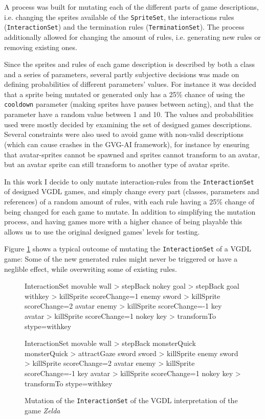 \documentclass[a4paper,titlepage,final]{report}
\begin{document}
A process was built for mutating each of the different parts of game descriptions, i.e. changing the sprites available of the \texttt{SpriteSet}, the interactions rules (\texttt{InteractionSet}) and the termination rules (\texttt{TerminationSet}).
The process additionally allowed for changing the amount of rules, i.e. generating new rules or removing existing ones.

Since the sprites and rules of each game description is described by both a class and a series of parameters, several partly subjective decisions was made on defining probabilities of different parameters' values.
For instance it was decided that a sprite being mutated or generated only has a 25\% chance of using the \texttt{cooldown} parameter (making sprites have pauses between acting), and that the parameter have a random value between 1 and 10.
The values and probabilities used were mostly decided by examining the set of designed games descriptions.
Several constraints were also used to avoid game with non-valid descriptions (which can cause crashes in the GVG-AI framework), for instance by ensuring that avatar-sprites cannot be spawned and sprites cannot transform to an avatar, but an avatar sprite can still transform to another type of avatar sprite.

In this work I decide to only mutate interaction-rules from the \texttt{InteractionSet} of designed VGDL games, and simply change every part (classes, parameters and references) of a random amount of rules, with each rule having a 25\% change of being changed for each game to mutate.
In addition to simplifying the mutation process, and having games more with a higher chance of being playable this allows us to use the original designed games' levels for testing.

Figure \ref{fig:mutatedzelda} shows a typical outcome of mutating the \texttt{InteractionSet} of a VGDL game: Some of the new generated rules might never be triggered or have a neglible effect, while overwriting some of existing rules.


\begin{figure}[!ht]
\centering
\begin{vgdldesc}[linewidth=14cm]
InteractionSet
	movable wall  > stepBack
	nokey goal    > stepBack
	goal withkey  > killSprite scoreChange=1
	enemy sword > killSprite scoreChange=2
	avatar enemy > killSprite scoreChange=-1
	key  avatar   > killSprite scoreChange=1
	nokey key     > transformTo stype=withkey  

InteractionSet
	movable wall > stepBack
	monsterQuick monsterQuick > attractGaze
	sword sword > killSprite
	enemy sword > killSprite scoreChange=2
	avatar enemy > killSprite scoreChange=-1
	key avatar > killSprite scoreChange=1
	nokey key > transformTo stype=withkey
\end{vgdldesc}
\caption{Mutation of the \texttt{InteractionSet} of the VGDL interpretation of the game \textit{Zelda}}
\label{fig:mutatedzelda}
\end{figure}
\end{document}
